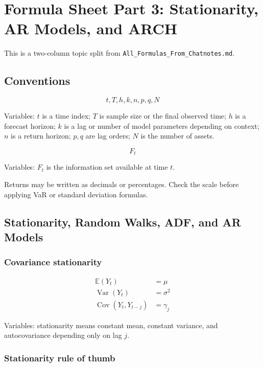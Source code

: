 \documentclass[
  8pt,
  twocolumn]{extarticle}
\author{}
\date{}
\begin{document}
\section{Formula Sheet Part 3: Stationarity, AR Models, and
ARCH}\label{formula-sheet-part-3-stationarity-ar-models-and-arch}

This is a two-column topic split from
\texttt{All\_Formulas\_From\_Chatnotes.md}.

\subsection{Conventions}\label{conventions}

\[
t,T,h,k,n,p,q,N
\]

Variables: \(t\) is a time index; \(T\) is sample size or the final
observed time; \(h\) is a forecast horizon; \(k\) is a lag or number of
model parameters depending on context; \(n\) is a return horizon;
\(p,q\) are lag orders; \(N\) is the number of assets.

\[
F_t
\]

Variables: \(F_t\) is the information set available at time \(t\).

Returns may be written as decimals or percentages. Check the scale
before applying VaR or standard deviation formulas.

\subsection{Stationarity, Random Walks, ADF, and AR
Models}\label{stationarity-random-walks-adf-and-ar-models}

\subsubsection{Covariance stationarity}\label{covariance-stationarity}

\[
\begin{aligned}
\mathbb E(Y_t)&=\mu\\
\operatorname{Var}(Y_t)&=\sigma^2\\
\operatorname{Cov}(Y_t,Y_{t-j})&=\gamma_j
\end{aligned}
\]

Variables: stationarity means constant mean, constant variance, and
autocovariance depending only on lag \(j\).

\subsubsection{Stationarity rule of
thumb}\label{stationarity-rule-of-thumb}
\end{document}
